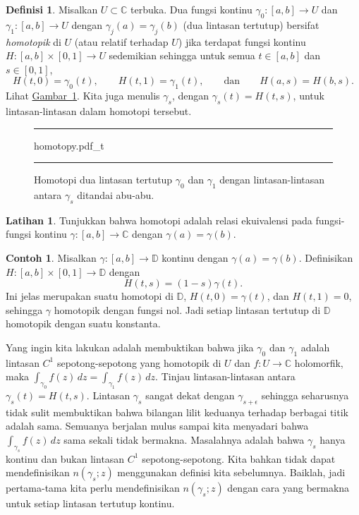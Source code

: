 \documentclass[12pt,openany]{book}
\newcommand{\C}{{\mathbb{C}}}
\newcommand{\D}{{\mathbb{D}}}
\newcommand{\myindex}[1]{#1\index{#1}}
\theoremstyle{plain}
\theoremstyle{remark}
\theoremstyle{definition}
\newtheorem{defn}[thm]{Definisi}
\newenvironment{exbox}{%
    \def\FrameCommand{\vrule width 1pt \relax\hspace{10pt}}%
    \MakeFramed{\advance\hsize-\width\FrameRestore}%
}{%
    \endMakeFramed
}
\newenvironment{myfig}{%
\begin{figure}[h!t]
\noindent\rule{\textwidth}{0.5pt}\vspace{12pt}\par\centering}%
{\par\noindent\rule{\textwidth}{0.5pt}
\end{figure}}
\theoremstyle{exercise}
\newtheorem{exercise}{Latihan}[section]
\theoremstyle{example}
\newtheorem{example}[thm]{Contoh}
\newcommand{\figureref}[1]{\hyperref[#1]{Gambar~\ref*{#1}}}
\begin{document}
\begin{defn}\label{defn:homotopy}
Misalkan $U \subset \C$ terbuka.
Dua fungsi kontinu
$\gamma_0 \colon [a,b] \to U$ dan
$\gamma_1 \colon [a,b] \to U$
dengan $\gamma_j(a)=\gamma_j(b)$ (dua lintasan tertutup)
bersifat \emph{\myindex{homotopik}} di $U$
(atau relatif terhadap $U$) jika terdapat fungsi kontinu
$H \colon [a,b] \times [0,1] \to U$ sedemikian sehingga
untuk semua $t \in [a,b]$ dan $s \in [0,1]$,
\begin{equation*}
H(t,0) = \gamma_0(t), \qquad
H(t,1) = \gamma_1(t), \qquad \text{dan} \qquad
H(a,s) = H(b,s) .
\end{equation*}
Lihat \figureref{fig:homotopy}.
Kita juga menulis $\gamma_s$, dengan $\gamma_s(t) = H(t,s)$, untuk lintasan-lintasan dalam homotopi tersebut.
\end{defn}

\begin{myfig}
{homotopy.pdf_t}
\caption{Homotopi dua lintasan tertutup $\gamma_0$ dan
$\gamma_1$ dengan lintasan-lintasan antara $\gamma_s$ ditandai abu-abu.\label{fig:homotopy}}
\end{myfig}

\begin{exbox}
\begin{exercise}
Tunjukkan bahwa homotopi adalah relasi ekuivalensi pada fungsi-fungsi kontinu
$\gamma \colon [a,b] \to \C$ dengan $\gamma(a)=\gamma(b)$.
\end{exercise}
\end{exbox}

\begin{example} \label{example:homotopydiscsc}
Misalkan $\gamma \colon [a,b] \to \D$ kontinu dengan $\gamma(a)=\gamma(b)$. Definisikan
$H \colon [a,b] \times [0,1] \to \D$ dengan
\begin{equation*}
H(t,s) = (1-s) \gamma(t) .
\end{equation*}
Ini jelas merupakan suatu homotopi di $\D$, $H(t,0) = \gamma(t)$,
dan $H(t,1) = 0$, sehingga $\gamma$ homotopik dengan fungsi nol.
Jadi setiap lintasan tertutup di $\D$ homotopik dengan suatu konstanta.
\end{example}

Yang ingin kita lakukan adalah membuktikan bahwa jika $\gamma_0$ dan $\gamma_1$ adalah
lintasan $C^1$ sepotong-sepotong yang homotopik di $U$ dan $f \colon U \to \C$ holomorfik, maka
$\int_{\gamma_0} f(z)\,dz = \int_{\gamma_1} f(z)\, dz$.
Tinjau lintasan-lintasan antara $\gamma_s(t) = H(t,s)$.
Lintasan $\gamma_s$ sangat dekat dengan
$\gamma_{s+\epsilon}$ sehingga seharusnya tidak sulit membuktikan bahwa bilangan
lilit keduanya terhadap berbagai titik adalah sama.
Semuanya berjalan mulus sampai kita menyadari bahwa $\int_{\gamma_s} f(z)
\, dz$ sama sekali tidak bermakna. Masalahnya adalah bahwa $\gamma_s$ hanya
kontinu dan bukan lintasan $C^1$ sepotong-sepotong. Kita bahkan tidak dapat
mendefinisikan $n(\gamma_s;z)$ menggunakan definisi kita sebelumnya.
Baiklah, jadi pertama-tama kita perlu mendefinisikan $n(\gamma_s;z)$ dengan cara yang bermakna untuk
setiap lintasan tertutup kontinu.
\end{document}
